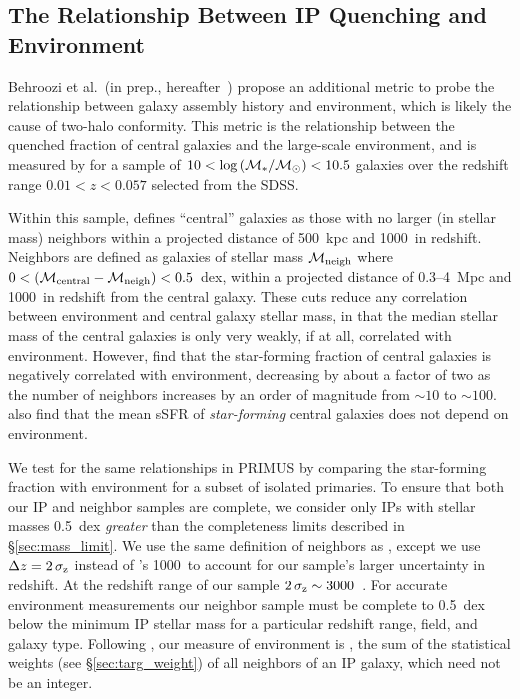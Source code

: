 \subsection{The Relationship Between IP Quenching and Environment}\label{sec:environment}

Behroozi et al.~(in prep., hereafter~\citePB) propose an additional metric to probe the relationship between galaxy assembly history and environment, which is likely the cause of two-halo conformity.
This metric is the relationship between the quenched fraction of central galaxies and the large-scale environment, and is measured by \citePB for a sample of ${10<\logM<10.5}$ galaxies over the redshift range ${0.01<z<0.057}$ selected from the SDSS.

Within this sample, \citePB defines ``central'' galaxies as those with no larger (in stellar mass) neighbors within a projected distance of 500~kpc and 1000~\kms in redshift.
Neighbors are defined as galaxies of stellar mass $\mneigh$ where ${0<(\mcentral-\mneigh)<0.5}$~dex, within a projected distance of 0.3--4~Mpc and 1000~\kms in redshift from the central galaxy.
These cuts reduce any correlation between environment and central galaxy  stellar mass, in that the median stellar mass of the central galaxies is only very weakly, if at all, correlated with environment.  
However, \citePB find that the star-forming fraction of central galaxies is negatively correlated with environment, decreasing by about a factor of two as the number of neighbors increases by an order of magnitude from $\sim10$ to $\sim100$.  \citePB also find that the mean sSFR of \emph{star-forming} central galaxies does not depend on environment.

We test for the same relationships in PRIMUS by comparing the star-forming fraction with environment for a subset of isolated primaries.
To ensure that both our IP and neighbor samples are complete, we consider only IPs with stellar masses 0.5~dex \emph{greater} than the completeness limits described in \S\ref{sec:mass_limit}.
We use the same definition of neighbors as \citePB, except we use ${\Delta z = 2\,\sigmaz}$ instead of \citePB's 1000~\kms to account for our sample's larger uncertainty in redshift.
At the redshift range of our sample ${2\,\sigmaz \sim 3000}$~\kms.
For accurate environment measurements our neighbor sample must be complete to 0.5~dex below the minimum IP stellar mass for a particular redshift range, field, and galaxy type.
Following \citePB, our measure of environment is \Nneigh, the sum of the statistical weights (see \S\ref{sec:targ_weight}) of all neighbors of an IP galaxy, which need not be an integer.

